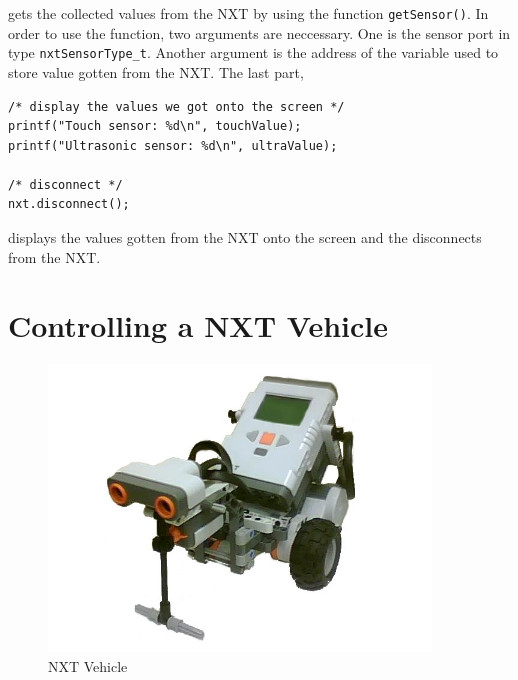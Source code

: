 \documentclass[11pt]{article}
\begin{document}
gets the collected values from the NXT by using the function \texttt{getSensor()}. In order to use the function, 
two arguments are neccessary. One is the sensor port in type \texttt{nxtSensorType\_t}. Another argument is the 
address of the variable used to store value gotten from the NXT. The last part,
\begin{verbatim}
/* display the values we got onto the screen */
printf("Touch sensor: %d\n", touchValue);
printf("Ultrasonic sensor: %d\n", ultraValue);

/* disconnect */
nxt.disconnect();
\end{verbatim}
\noindent
displays the values gotten from the NXT onto the screen and the disconnects from the NXT.

\newpage
\section{Controlling a NXT Vehicle}
\begin{figure}[h!]
  \begin{center}
    \includegraphics[height=3in]{figure/mindstorm/NXT_vehicle.png}
    \caption{NXT Vehicle\label{fig_NXT_vehicle}}
  \end{center}
\end{figure}
\end{document}
